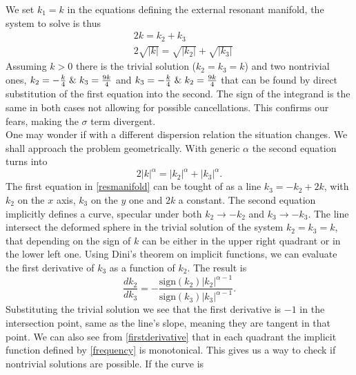     We set $k_1=k$ in the equations defining the external resonant manifold, the system to solve is thus
    \begin{equation}
        \begin{aligned}
            &2k = k_2 + k_3 \\
            &2\sqrt{|k|} = \sqrt{|k_2|} + \sqrt{|k_3|}
        \end{aligned}
        \label{resmanifold}
    \end{equation}
    Assuming $k>0$ there is the trivial solution ($k_2 = k_3 = k$) and two nontrivial ones,
    $k_2 = -\frac{k}{4} \hspace{1mm} \& \hspace{1mm}k_3 = \frac{9k}{4} $ and $k_3 = -\frac{k}{4} \hspace{1mm}\& \hspace{1mm}k_2 = \frac{9k}{4} $ that can be found by direct substitution of the first equation into the second. The sign of the integrand is the same in both cases not allowing for possible cancellations.  This confirms our fears, making the $\sigma$ term divergent.\\
    One may wonder if with a different dispersion relation the situation changes. We shall approach the problem geometrically.
    With generic $\alpha$ the second equation turns into 
    \begin{equation}
      2|k|^{\alpha} = |k_2|^{\alpha} +|k_3|^{\alpha}.
      \label{frequency}
    \end{equation} 
    The first equation in \eqref{resmanifold} can be tought of as a line $k_3 = -k_2 + 2k$, with $k_2$ on the $x$ axis, $k_3$ on the $y$ one and $2k$ a constant. The second equation implicitly defines  a curve, specular under both $k_2 \rightarrow -k_2$ and $k_3 \rightarrow -k_3$. The line intersect the deformed sphere in the trivial solution of the system $k_2 = k_3 = k$, that depending on the sign of $k$ can be either in the upper right quadrant or in the lower left one. Using Dini's theorem on implicit functions, we can evaluate the first derivative of $k_3$ as a function of $k_2$. The result is 
    \begin{equation}
        \frac{d k_2}{dk_3} = -\frac{\text{sign}(k_2)|k_2|^{\alpha-1}}{\text{sign}(k_3)|k_3|^{\alpha-1}}.
        \label{firstderivative}
    \end{equation}
    Substituting the trivial solution we see that the first derivative is $-1$ in the intersection point, same as the line's slope, meaning they are tangent in that point. We can also see from \eqref{firstderivative} that in each quadrant the implicit function defined by \eqref{frequency} is monotonical. This gives us a way to check if nontrivial solutions are possible. If the curve is 
